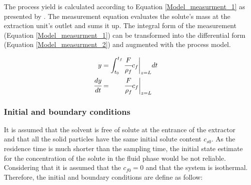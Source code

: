 \documentclass[../Article_Model_Parameters.tex]{subfiles}
\begin{document}
		The process yield is calculated according to Equation \ref{Model_measurment_1} as presented by \citet{Sovova1994a}. The measurement equation evaluates the solute's mass at the extraction unit's outlet and sums it up. The integral form of the measurement (Equation \ref{Model_measurment_1}) can be transformed into the differential form (Equation \ref{Model_measurment_2}) and augmented with the process model.
			
		{\footnotesize
			\begin{align} 
				\label{Model_measurment_1}
				y &= \int_{t_0}^{t_f} \cfrac{F}{\rho_f} c_f \biggr\rvert_{z=L} dt \\
				\cfrac{dy}{dt} &= \qquad \cfrac{F}{\rho_f} c_f \biggr\rvert_{z=L} 
                \label{Model_measurment_2}
		\end{align}	}
  
		\subsubsection{Initial and boundary conditions} 
		It is assumed that the solvent is free of solute at the entrance of the extractor and that all the solid particles have the same initial solute content $c_{s0}$. As the residence time is much shorter than the sampling time, the initial state estimate for the concentration of the solute in the fluid phase would be not reliable. Considering that it is assumed that the $c_{f0}=0$ and that the system is isothermal. %
		Therefore, the initial and boundary conditions are define as follow:
			

			
\end{document}
